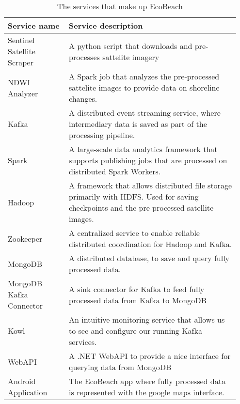 \begin{table}[]
    \centering
    \begin{tabular}{| p{0.25\linewidth} | p{0.7\linewidth} |}
        \hline
        \textbf{Service name}      & \textbf{Service description}                                                                                                              \\ \hline
        Sentinel Satellite Scraper & A python script that downloads and pre-processes sattelite imagery                                                                        \\\hline
        NDWI Analyzer              & A Spark job that analyzes the pre-processed sattelite images to provide data on shoreline changes.                                        \\\hline
        Kafka                      & A distributed event streaming service, where intermediary data is saved as part of the processing pipeline.                               \\\hline
        Spark                      & A large-scale data analytics framework that supports publishing jobs that are processed on distributed Spark Workers.                     \\\hline
        Hadoop                     & A framework that allows distributed file storage primarily with HDFS. Used for saving checkpoints and the pre-processed satellite images. \\\hline
        Zookeeper                  & A centralized service to enable reliable distributed coordination for Hadoop and Kafka.                                                   \\\hline
        MongoDB                    & A distributed database, to save and query fully processed data.                                                                           \\\hline
        MongoDB Kafka Connector    & A sink connector for Kafka to feed fully processed data from Kafka to MongoDB                                                             \\\hline
        Kowl                       & An intuitive monitoring service that allows us to see and configure our running Kafka services.                                           \\\hline
        WebAPI                     & A .NET WebAPI to provide a nice interface for querying data from MongoDB                                                                  \\\hline
        Android Application        & The EcoBeach app where fully processed data is represented with the google maps interface.                                                \\\hline
    \end{tabular}
    \caption{The services that make up EcoBeach}
    \label{tab:ecobeach-services}
\end{table}

